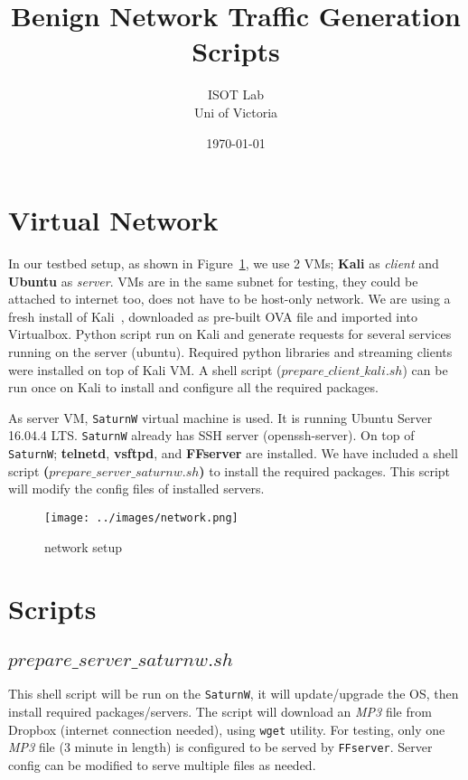 \documentclass[a4paper]{article}
\title{Benign Network Traffic Generation Scripts}
\author{ISOT Lab \\ Uni of Victoria}
\date{\today}
\begin{document}
\maketitle

\setcounter{tocdepth}{4}
\setcounter{secnumdepth}{4}
\tableofcontents
\pagebreak

\section{Virtual Network}
In our testbed setup, as shown in Figure~\ref{fig:networkdiagram}, we use 2 VMs; 
\textbf{Kali} as \textit{client} and \textbf{Ubuntu} as \textit{server}. 
VMs are in the same subnet for testing, they could be attached to internet too, 
does not have to be host-only network. 
We are using a fresh install of Kali~\cite{kalidownload}, downloaded as pre-built OVA file and imported into Virtualbox.
Python script run on Kali and generate requests for several services running on the server (ubuntu).
Required python libraries and streaming clients were installed on top of Kali VM.
A shell script ($prepare\_client\_kali.sh$) can be run once on Kali to install and configure all the required packages.


As server VM, \texttt{SaturnW} virtual machine is used. 
It is running Ubuntu Server 16.04.4 LTS.
\texttt{SaturnW} already has SSH server (openssh-server).
On top of \texttt{SaturnW}; \textbf{telnetd}, \textbf{vsftpd}, and \textbf{FFserver} are installed.
We have included a shell script \textbf{($prepare\_server\_saturnw.sh$)} to install the required packages.
This script will modify the config files of installed servers.

\begin{figure}[ht]
\texttt{[image: ../images/network.png]}
\label{fig:networkdiagram}
\caption{network setup}
\end{figure}

\section{Scripts}
\subsection{$prepare\_server\_saturnw.sh$}
This shell script will be run on the \texttt{SaturnW}, it will update/upgrade the OS, 
then install required packages/servers.
The script will download an \textit{MP3} file from Dropbox (internet connection needed), using \texttt{wget} utility. 
For testing, only one \textit{MP3} file (3 minute in length) is configured to be served by \texttt{FFserver}. 
Server config can be modified to serve multiple files as needed. 
\end{document}
